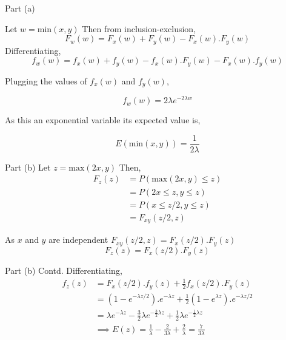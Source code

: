 \documentclass{beamer}
\begin{document}
\begin{frame}{Part (a)}

    Let $w = \text{min}(x,y)$
    Then from inclusion-exclusion,
    \begin{equation}
        F_w(w) = F_x(w) + F_y(w) - F_x(w).F_y(w)
    \end{equation}
    Differentiating,
    \begin{equation}
        f_w(w) = f_x(w) + f_y(w) - f_x(w).F_y(w) - F_x(w).f_y(w)
    \end{equation}
    
    Plugging the values of $f_x(w)$ and $f_y(w)$,
    
    \begin{equation}
        f_w(w) = 2\lambda e^{-2\lambda w}
    \end{equation}
    
    As this an exponential variable its expected value is,
    
    \begin{equation}
        E(\text{min}(x,y)) = \frac{1}{2\lambda}
    \end{equation}
    
\end{frame} 

\begin{frame}{Part (b)}
    Let $z = \text{max}(2x,y)$
    Then,
    \begin{align}
        F_z(z) &= P(\text{max}(2x, y) \leq z) \\
        &= P(2x \leq z, y \leq z) \\
        &= P(x \leq z/2, y \leq z) \\
        &= F_{xy}(z/2 , z)
    \end{align}
    
    As $x$ and $y$ are independent $F_{xy}(z/2 , z) = F_x(z/2).F_y(z)$
    \begin{equation}
        F_z(z) = F_x(z/2).F_y(z)
    \end{equation}
\end{frame}

\begin{frame}{Part (b) Contd.}
    Differentiating, 
    \begin{align}
        f_z(z) &= F_x(z/2).f_y(z) + \frac{1}{2} f_x(z/2).F_y(z)\\
        &= \left(1 - e^{-\lambda z/2} \right).e^{-\lambda z} + \frac{1}{2}\left(1 - e^{\lambda z} \right).e^{-\lambda z/2}\\
        &= \lambda e^{-\lambda z} - \frac{3}{2}\lambda e^{-\frac{3}{2}\lambda z} + \frac{1}{2}\lambda e^{-\frac{1}{2}\lambda z} \\
        &\implies E(z) = \frac{1}{\lambda} - \frac{2}{3\lambda} + \frac{2}{\lambda} = \frac{7}{3\lambda}
    \end{align}
\end{frame}
\end{document}
